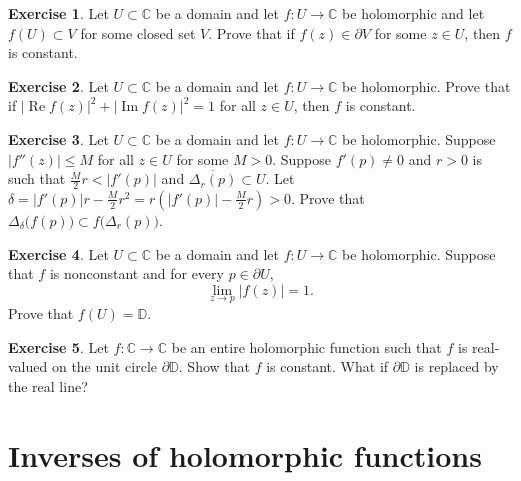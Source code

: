 \documentclass[12pt,openany]{book}
\renewcommand{\Re}{\operatorname{Re}}
\renewcommand{\Im}{\operatorname{Im}}
\newcommand{\abs}[1]{\left\lvert {#1} \right\rvert}
\newcommand{\C}{{\mathbb{C}}}
\newcommand{\D}{{\mathbb{D}}}
\theoremstyle{plain}
\theoremstyle{remark}
\theoremstyle{definition}
\newenvironment{exbox}{%
    \def\FrameCommand{\vrule width 1pt \relax\hspace{10pt}}%
    \MakeFramed{\advance\hsize-\width\FrameRestore}%
}{%
    \endMakeFramed
}
\theoremstyle{exercise}
\newtheorem{exercise}{Exercise}[section]
\theoremstyle{example}
\begin{document}
\begin{exbox}
\begin{exercise}
Let $U \subset \C$ be a domain and let $f \colon U \to \C$ be holomorphic
and let $f(U) \subset V$ for some closed set $V$.
Prove that if $f(z) \in \partial V$
for some $z \in U$, then $f$ is constant.
\end{exercise}

\begin{exercise}
Let $U \subset \C$ be a domain and let $f \colon U \to \C$ be holomorphic.
Prove that if $\abs{\Re f(z)}^2 + \abs{\Im f(z)}^2 = 1$ for all $z \in U$,
then $f$ is constant.
\end{exercise}

\begin{exercise}
Let $U \subset \C$ be a domain and let $f \colon U \to \C$ be holomorphic.
Suppose $\abs{f''(z)} \leq M$ for all $z \in U$ for some $M > 0$.
Suppose $f'(p) \not= 0$ and $r > 0$ is such that
$\frac{M}{2}r < \abs{f'(p)}$ and $\overline{\Delta_r(p)} \subset U$.
Let $\delta = \abs{f'(p)}r - \frac{M}{2} r^2
= r\left(\abs{f'(p)} - \frac{M}{2} r\right) > 0$.  Prove that
$\Delta_{\delta}\bigl(f(p)\bigr) \subset f\bigl( \Delta_r(p) \bigr)$.
\end{exercise}

\begin{exercise}
Let $U \subset \C$ be a domain and let $f \colon U \to \C$ be holomorphic.
Suppose that $f$ is nonconstant and for every $p \in \partial U$,
\begin{equation*}
\lim_{z \to p} \abs{f(z)}=1 .
\end{equation*}
Prove that $f(U) = \D$.
\end{exercise}

\begin{exercise}
Let $f \colon \C \to \C$ be an entire holomorphic function such that
$f$ is real-valued on the unit circle $\partial \D$.  Show that $f$ is
constant.  What if $\partial \D$ is replaced by the real line?
\end{exercise}
\end{exbox}




\section{Inverses of holomorphic functions} \label{sec:inverses}
\end{document}
